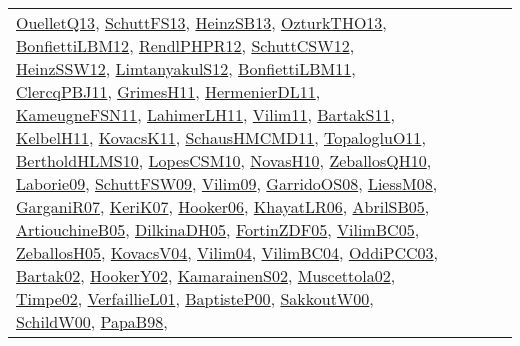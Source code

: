 {\begin{longtable}{llp{6cm}p{6cm}p{6cm}}
\href{papers/OuelletQ13.pdf}{OuelletQ13}\cite{OuelletQ13}, \href{papers/SchuttFS13.pdf}{SchuttFS13}\cite{SchuttFS13}, \href{articles/HeinzSB13.pdf}{HeinzSB13}\cite{HeinzSB13}, \href{articles/OzturkTHO13.pdf}{OzturkTHO13}\cite{OzturkTHO13}, \href{papers/BonfiettiLBM12.pdf}{BonfiettiLBM12}\cite{BonfiettiLBM12}, \href{papers/RendlPHPR12.pdf}{RendlPHPR12}\cite{RendlPHPR12}, \href{papers/SchuttCSW12.pdf}{SchuttCSW12}\cite{SchuttCSW12}, \href{articles/HeinzSSW12.pdf}{HeinzSSW12}\cite{HeinzSSW12}, \href{articles/LimtanyakulS12.pdf}{LimtanyakulS12}\cite{LimtanyakulS12}, \href{papers/BonfiettiLBM11.pdf}{BonfiettiLBM11}\cite{BonfiettiLBM11}, \href{papers/ClercqPBJ11.pdf}{ClercqPBJ11}\cite{ClercqPBJ11}, \href{papers/GrimesH11.pdf}{GrimesH11}\cite{GrimesH11}, \href{papers/HermenierDL11.pdf}{HermenierDL11}\cite{HermenierDL11}, \href{papers/KameugneFSN11.pdf}{KameugneFSN11}\cite{KameugneFSN11}, \href{papers/LahimerLH11.pdf}{LahimerLH11}\cite{LahimerLH11}, \href{papers/Vilim11.pdf}{Vilim11}\cite{Vilim11}, \href{articles/BartakS11.pdf}{BartakS11}\cite{BartakS11}, \href{articles/KelbelH11.pdf}{KelbelH11}\cite{KelbelH11}, \href{articles/KovacsK11.pdf}{KovacsK11}\cite{KovacsK11}, \href{articles/SchausHMCMD11.pdf}{SchausHMCMD11}\cite{SchausHMCMD11}, \href{articles/TopalogluO11.pdf}{TopalogluO11}\cite{TopalogluO11}, \href{papers/BertholdHLMS10.pdf}{BertholdHLMS10}\cite{BertholdHLMS10}, \href{articles/LopesCSM10.pdf}{LopesCSM10}\cite{LopesCSM10}, \href{articles/NovasH10.pdf}{NovasH10}\cite{NovasH10}, \href{articles/ZeballosQH10.pdf}{ZeballosQH10}\cite{ZeballosQH10}, \href{papers/Laborie09.pdf}{Laborie09}\cite{Laborie09}, \href{papers/SchuttFSW09.pdf}{SchuttFSW09}\cite{SchuttFSW09}, \href{papers/Vilim09.pdf}{Vilim09}\cite{Vilim09}, \href{articles/GarridoOS08.pdf}{GarridoOS08}\cite{GarridoOS08}, \href{articles/LiessM08.pdf}{LiessM08}\cite{LiessM08}, \href{papers/GarganiR07.pdf}{GarganiR07}\cite{GarganiR07}, \href{papers/KeriK07.pdf}{KeriK07}\cite{KeriK07}, \href{articles/Hooker06.pdf}{Hooker06}\cite{Hooker06}, \href{articles/KhayatLR06.pdf}{KhayatLR06}\cite{KhayatLR06}, \href{papers/AbrilSB05.pdf}{AbrilSB05}\cite{AbrilSB05}, \href{papers/ArtiouchineB05.pdf}{ArtiouchineB05}\cite{ArtiouchineB05}, \href{papers/DilkinaDH05.pdf}{DilkinaDH05}\cite{DilkinaDH05}, \href{papers/FortinZDF05.pdf}{FortinZDF05}\cite{FortinZDF05}, \href{articles/VilimBC05.pdf}{VilimBC05}\cite{VilimBC05}, \href{articles/ZeballosH05.pdf}{ZeballosH05}\cite{ZeballosH05}, \href{papers/KovacsV04.pdf}{KovacsV04}\cite{KovacsV04}, \href{papers/Vilim04.pdf}{Vilim04}\cite{Vilim04}, \href{papers/VilimBC04.pdf}{VilimBC04}\cite{VilimBC04}, \href{papers/OddiPCC03.pdf}{OddiPCC03}\cite{OddiPCC03}, \href{papers/Bartak02.pdf}{Bartak02}\cite{Bartak02}, \href{papers/HookerY02.pdf}{HookerY02}\cite{HookerY02}, \href{papers/KamarainenS02.pdf}{KamarainenS02}\cite{KamarainenS02}, \href{papers/Muscettola02.pdf}{Muscettola02}\cite{Muscettola02}, \href{articles/Timpe02.pdf}{Timpe02}\cite{Timpe02}, \href{papers/VerfaillieL01.pdf}{VerfaillieL01}\cite{VerfaillieL01}, \href{articles/BaptisteP00.pdf}{BaptisteP00}\cite{BaptisteP00}, \href{articles/SakkoutW00.pdf}{SakkoutW00}\cite{SakkoutW00}, \href{articles/SchildW00.pdf}{SchildW00}\cite{SchildW00}, \href{articles/PapaB98.pdf}{PapaB98}\cite{PapaB98}, 
\end{longtable}}

